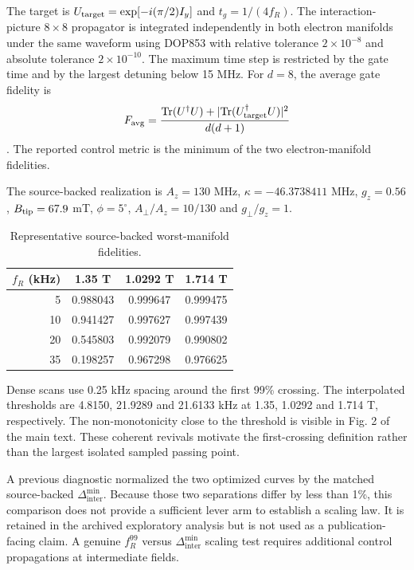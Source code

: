 \documentclass[11pt]{article}
\newcommand{\DeltaInter}{\Delta_{\mathrm{inter}}^{\min}}
\newcommand{\fR}{f_R}
\begin{document}
The target is $U_{\rm target}=\exp[-i(\pi/2)I_y]$ and $t_g=1/(4\fR)$. The interaction-picture $8\times8$ propagator is integrated independently in both electron manifolds under the same waveform using DOP853 with relative tolerance $2\times10^{-8}$ and absolute tolerance $2\times10^{-10}$. The maximum time step is restricted by the gate time and by the largest detuning below 15 MHz. For $d=8$, the average gate fidelity is
\begin{equation}
F_{\rm avg}=\frac{\mathrm{Tr}(U^\dagger U)+|\mathrm{Tr}(U_{\rm target}^\dagger U)|^2}{d(d+1)}
\end{equation}
\cite{nielsen2002}. The reported control metric is the minimum of the two electron-manifold fidelities.

The source-backed realization is $A_z=130$ MHz, $\kappa=-46.3738411$ MHz, $g_z=0.56$, $B_{\rm tip}=67.9$ mT, $\phi=5^\circ$, $A_\perp/A_z=10/130$ and $g_\perp/g_z=1$.
\begin{table}[h]
\centering
\caption{Representative source-backed worst-manifold fidelities.}
\begin{tabular}{rccc}
\toprule
$\fR$ (kHz) & 1.35 T & 1.0292 T & 1.714 T\\
\midrule
5 & 0.988043 & 0.999647 & 0.999475\\
10 & 0.941427 & 0.997627 & 0.997439\\
20 & 0.545803 & 0.992079 & 0.990802\\
35 & 0.198257 & 0.967298 & 0.976625\\
\bottomrule
\end{tabular}
\end{table}
Dense scans use 0.25 kHz spacing around the first 99\% crossing. The interpolated thresholds are 4.8150, 21.9289 and 21.6133 kHz at 1.35, 1.0292 and 1.714 T, respectively. The non-monotonicity close to the threshold is visible in Fig. 2 of the main text. These coherent revivals motivate the first-crossing definition rather than the largest isolated sampled passing point.

A previous diagnostic normalized the two optimized curves by the matched source-backed $\DeltaInter$. Because those two separations differ by less than 1\%, this comparison does not provide a sufficient lever arm to establish a scaling law. It is retained in the archived exploratory analysis but is not used as a publication-facing claim. A genuine $\fR^{99}$ versus $\DeltaInter$ scaling test requires additional control propagations at intermediate fields.
\end{document}
